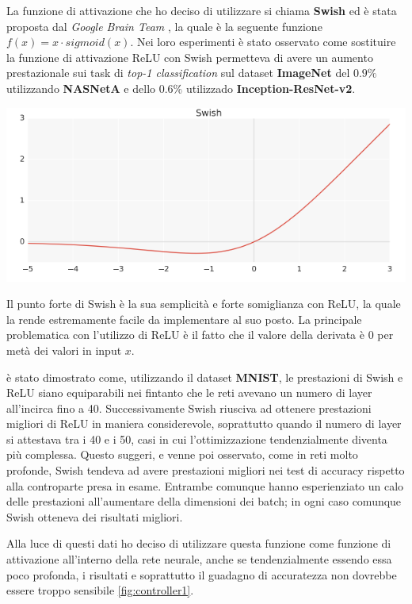 La funzione di attivazione che ho deciso di utilizzare si chiama \textbf{Swish} ed è stata proposta dal 
\emph{Google Brain Team} \cite{ramachandran2017searching}, la quale è la seguente funzione $f(x) = x \cdot sigmoid(x)$. 
Nei loro esperimenti è stato osservato come sostituire la funzione di attivazione ReLU con Swish permetteva 
di avere un aumento prestazionale sui task di \emph{top-1 classification} sul dataset \textbf{ImageNet} del $0.9\%$ utilizzando
\textbf{NASNetA} e dello $0.6\%$ utilizzado \textbf{Inception-ResNet-v2}. 

\begin{minipage}{\linewidth}
	\centering
	\includegraphics[width=\textwidth]{img/Screen-Shot-2017-10-18-at-2.39.55-PM.png}
	\label{fig:swish}
\end{minipage}

Il punto forte di Swish è la sua semplicità e forte somiglianza con ReLU, la quale la rende estremamente facile da implementare
al suo posto. La principale problematica con l'utilizzo di ReLU è il fatto che il valore della derivata è 0 per metà 
dei valori in input $x$. 

è stato dimostrato come, utilizzando il dataset \textbf{MNIST}, le prestazioni di Swish e ReLU siano 
equiparabili nei fintanto che le reti avevano un numero di layer all'incirca fino a 40. Successivamente Swish riusciva ad ottenere 
prestazioni migliori di ReLU in maniera considerevole, soprattutto quando il numero di layer si attestava tra i 40 e i 50, casi 
in cui l'ottimizzazione tendenzialmente diventa più complessa. Questo suggeri, e venne poi osservato, come 
in reti molto profonde, Swish tendeva ad avere prestazioni migliori nei test di accuracy rispetto alla controparte presa in esame. 
Entrambe comunque hanno esperienziato un calo delle prestazioni all'aumentare della dimensioni dei batch; in ogni caso comunque Swish otteneva 
dei risultati migliori. 

Alla luce di questi dati ho deciso di utilizzare questa funzione come funzione di attivazione all'interno della rete neurale, 
anche se tendenzialmente essendo essa poco profonda, i risultati e soprattutto il guadagno di accuratezza non dovrebbe essere troppo sensibile \ref{fig:controller1}.